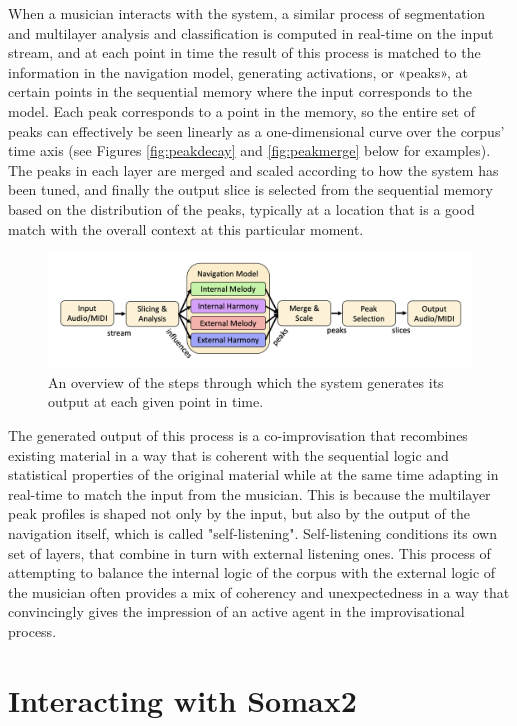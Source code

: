 When a musician interacts with the system, a similar process of segmentation and multilayer analysis and classification is computed in real-time on the input stream, and at each point in time the result of this process is matched to  the information in the navigation model, generating activations, or «peaks», at certain points in the sequential memory  where the input corresponds to the model. Each peak corresponds to a point in the memory, so the entire set of peaks can effectively be seen linearly as a one-dimensional curve over the corpus' time axis (see Figures \ref{fig:peakdecay} and \ref{fig:peakmerge}  below for examples). The peaks in each layer are merged and scaled  according to how the system has been tuned, and finally the output slice is selected from the sequential memory based on the distribution of the peaks, typically at a location that is a good match  with the overall context at this particular moment.

 \begin{figure}[h!]
    \centering        
 	\includegraphics[width=1\textwidth]{img/navigation_model.png}
    \caption{An overview of the steps through which the system generates its output at each given point in time.}
    \label{fig:navigation_model}
\end{figure}

The generated output of this process is a co-improvisation that recombines existing material in a way that is coherent with the sequential logic and statistical properties of the original material while at the same time adapting in real-time to match the input from the musician. This is because the multilayer peak profiles is shaped not only by  the input, but also by the output of the navigation itself, which is called "self-listening". Self-listening conditions its own set of layers, that combine in turn with external listening ones. This  process of attempting to balance the internal logic of the corpus with the external logic of the musician often provides a mix of coherency and unexpectedness in a way that convincingly gives the impression of an active agent in the improvisational process.

\section{Interacting with Somax2}

